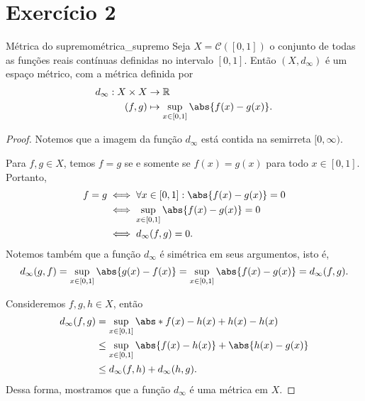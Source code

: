 \section*{Exercício 2}
\begin{proposition}{Métrica do supremo}{métrica_supremo}
    Seja \(X = \mathcal{C}([0,1])\) o conjunto de todas as funções reais contínuas definidas no intervalo \([0,1]\). Então \((X, d_\infty)\) é um espaço métrico, com a métrica definida por
    \begin{align*}
        d_\infty : X \times X &\to \mathbb{R}\\
                        (f,g) &\mapsto \sup_{x \in [0,1]} \abs{f(x) - g(x)}.
    \end{align*}
\end{proposition}
\begin{proof}
    Notemos que a imagem da função \(d_\infty\) está contida na semirreta \([0,\infty)\).

    Para \(f,g \in X\), temos \(f = g\) se e somente se \(f(x) = g(x)\) para todo \(x \in [0,1]\). Portanto,
    \begin{align*}
        f = g &\iff \forall x \in [0,1] : \abs{f(x) - g(x)} = 0\\
              &\iff \sup_{x \in [0,1]}  \abs{f(x) - g(x)} = 0\\
              &\iff d_\infty(f,g) = 0.
    \end{align*}
    Notemos também que a função \(d_\infty\) é simétrica em seus argumentos, isto é,
    \begin{equation*}
        d_\infty(g,f) = \sup_{x\in[0,1]}\abs{g(x) - f(x)} = \sup_{x\in[0,1]} \abs{f(x) - g(x)} = d_\infty(f,g).
    \end{equation*}

    Consideremos \(f,g,h \in X\), então
    \begin{align*}
        d_\infty(f,g) &= \sup_{x\in[0,1]}\abs*{f(x) - h(x) + h(x) - h(x)}\\\
                      &\leq \sup_{x\in[0,1]} \abs{f(x) - h(x)} + \abs{h(x) - g(x)}\\
                      &\leq d_\infty(f,h) + d_\infty(h,g).
    \end{align*}
    Dessa forma, mostramos que a função \(d_\infty\) é uma métrica em \(X\).
\end{proof}
